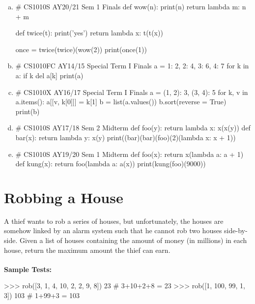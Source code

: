 \begin{enumerate}[(a)]
\item
\begin{python}
# CS1010S AY20/21 Sem 1 Finals
def wow(n):
    print(n)
    return lambda m: n + m

def twice(t):
    print('yes')
    return lambda x: t(t(x))

once = twice(twice)(wow(2))
print(once(1))
\end{python}

\item
\begin{python}
# CS1010FC AY14/15 Special Term I Finals
a = {1: 2, 2: 4, 3: 6, 4: 7}
for k in a:
    if k %
        del a[k]
print(a)
\end{python}

\item
\begin{python}
# CS1010X AY16/17 Special Term I Finals
a = {(1, 2): 3, (3, 4): 5}
for k, v in a.items():
    a[[v, k[0]]] = k[1]
b = list(a.values())
b.sort(reverse = True)
print(b)
\end{python}

\item
\begin{python}
# CS1010S AY17/18 Sem 2 Midterm
def foo(y):
    return lambda x: x(x(y))
def bar(x):
    return lambda y: x(y)
print((bar)(bar)(foo)(2)(lambda x: x + 1))
\end{python}

\item
\begin{python}
# CS1010S AY19/20 Sem 1 Midterm
def foo(x):
    return x(lambda a: a + 1)
def kung(x):
    return foo(lambda a: a(x))
print(kung(foo)(9000))
\end{python}
\end{enumerate}

\section{Robbing a House}
A thief wants to rob a series of houses, but unfortunately, the houses are somehow
linked by an alarm system such that he cannot rob two houses side-by-side. Given a list
of houses containing the amount of money (in millions) in each house, return the
maximum amount the thief can earn. \\ \\
\textbf{Sample Tests:}
\begin{python}
>>> rob([3, 1, 4, 10, 2, 2, 9, 8])
23  # 3+10+2+8 = 23
>>> rob([1, 100, 99, 1, 3])
103 # 1+99+3 = 103
\end{python}


